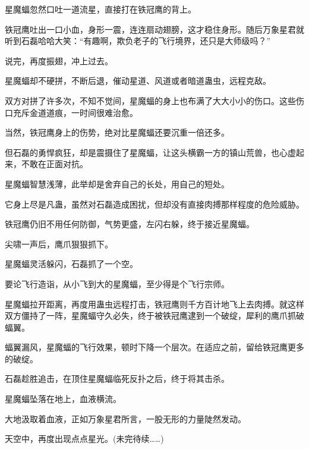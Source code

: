 \begin{this_body}
星魔蝠忽然口吐一道流星，直接打在铁冠鹰的背上。

铁冠鹰吐出一口小血，身形一震，连连扇动翅膀，这才稳住身形。随后万象星君就听到石磊哈哈大笑：“有趣啊，欺负老子的飞行境界，还只是大师级吗？”

说完，再度振翅，冲上过去。

星魔蝠却不硬拼，不断后退，催动星道、风道或者暗道蛊虫，远程克敌。

双方对拼了许多次，不知不觉间，星魔蝠的身上也布满了大大小小的伤口。这些伤口充斥金道道痕，一时间很难治愈。

当然，铁冠鹰身上的伤势，绝对比星魔蝠还要沉重一倍还多。

但石磊的勇悍疯狂，却是震摄住了星魔蝠，让这头横霸一方的镇山荒兽，也心虚起来，不敢在正面对抗。

星魔蝠智慧浅薄，此举却是舍弃自己的长处，用自己的短处。

它身上尽是凡蛊，虽然对石磊造成困扰，但却没有直接肉搏那样程度的危险威胁。

铁冠鹰仍旧不用任何防御，气势更盛，左闪右躲，终于接近星魔蝠。

尖啸一声后，鹰爪狠狠抓下。

星魔蝠灵活躲闪，石磊抓了一个空。

要论飞行造诣，从小飞到大的星魔蝠，至少得是个飞行宗师。

星魔蝠拉开距离，再度用蛊虫远程打击，铁冠鹰则千方百计地飞上去肉搏。就这样双方僵持了一阵，星魔蝠守久必失，终于被铁冠鹰逮到一个破绽，犀利的鹰爪抓破蝠翼。

蝠翼漏风，星魔蝠的飞行效果，顿时下降一个层次。在适应之前，留给铁冠鹰更多的破绽。

石磊趁胜追击，在顶住星魔蝠临死反扑之后，终于将其击杀。

星魔蝠坠落在地上，血液横流。

大地汲取着血液，正如万象星君所言，一股无形的力量陡然发动。

天空中，再度出现点点星光。(未完待续……)

\end{this_body}

